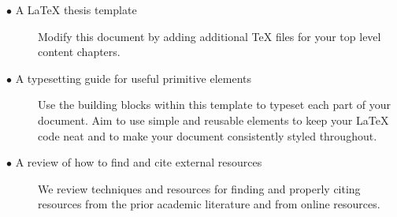 		\begin{description}	

			\item[\(\bullet\) A \LaTeX{} thesis template]\hfill

Modify this document by adding additional \TeX{} files for your top level content chapters. 

			\item[\(\bullet\) A typesetting guide for useful primitive elements]\hfill

Use the building blocks within this template to typeset each part of your document.
Aim to use simple and reusable elements to keep your \LaTeX{} code neat and to make your document consistently styled throughout.

			\item[\(\bullet\) A review of how to find and cite external resources]\hfill

We review techniques and resources for finding and properly citing resources from the prior academic literature and from online resources.

		\end{description}